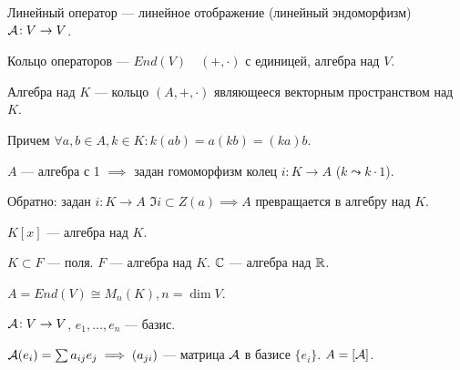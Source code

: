\begin{definition}
    Линейный оператор --- линейное отображение (линейный эндоморфизм) $\mathcal{A}\!: V \to V$.

    Кольцо операторов --- $End(V)\quad (+, \cdot)$ с единицей, алгебра над $V$.
\end{definition}
\begin{definition}
    Алгебра над $K$ --- кольцо  $(A, +, \cdot)$ являющееся векторным пространством над  $K$.

    Причем $\forall a, b \in A, k \in K\!: k(ab) = a(kb) = (ka)b$.
\end{definition}
\begin{remark}
    $A$ --- алгебра с 1  $\implies$ задан гомоморфизм колец  $i\!: K\to A$ ($k \leadsto k \cdot 1$).

    Обратно: задан $i\!: K \to A$  $\Im i \subset Z(a) \implies A$ превращается в алгебру над $K$.
\end{remark}
\begin{example}
    $K[x]$ --- алгебра над  $K$.
\end{example}
\begin{example}
    $K \subset F$ --- поля.  $F$ --- алгебра над  $K$.  $\mathbb{C}$ --- алгебра над  $\mathbb{R}$.
\end{example}
\begin{example}
    $A = End(V) \cong M_n(K), n = \dim V$.
\end{example}
\begin{remark}[Напоминание]
    $\mathcal{A}\!: V \to V$,  $e_1, \ldots, e_n$ --- базис.

    $\mathcal{A}(e_i) = \sum a_{ij} e_j \implies (a_{ji})$ --- матрица  $\mathcal{A}$ в базисе  $\{e_i\}$.  $A = [\mathcal{A}]$.
\end{remark}

